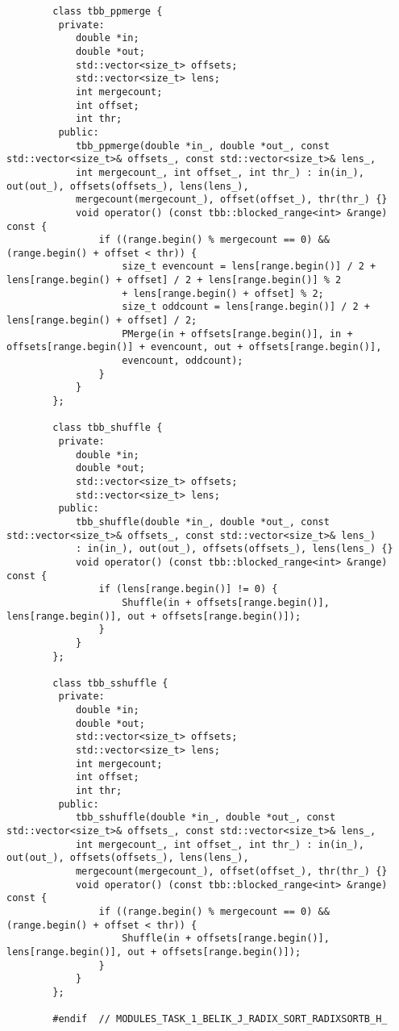 \documentclass{report}
\begin{document}
\begin{lstlisting}
		class tbb_ppmerge {
		 private:
			double *in;
			double *out;
			std::vector<size_t> offsets;
			std::vector<size_t> lens;
			int mergecount;
			int offset;
			int thr;
		 public:
			tbb_ppmerge(double *in_, double *out_, const std::vector<size_t>& offsets_, const std::vector<size_t>& lens_,
			int mergecount_, int offset_, int thr_) : in(in_), out(out_), offsets(offsets_), lens(lens_),
			mergecount(mergecount_), offset(offset_), thr(thr_) {}
			void operator() (const tbb::blocked_range<int> &range) const {
				if ((range.begin() % mergecount == 0) && (range.begin() + offset < thr)) {
					size_t evencount = lens[range.begin()] / 2 + lens[range.begin() + offset] / 2 + lens[range.begin()] % 2
					+ lens[range.begin() + offset] % 2;
					size_t oddcount = lens[range.begin()] / 2 + lens[range.begin() + offset] / 2;
					PMerge(in + offsets[range.begin()], in + offsets[range.begin()] + evencount, out + offsets[range.begin()],
					evencount, oddcount);
				}
			}
		};

		class tbb_shuffle {
		 private:
			double *in;
			double *out;
			std::vector<size_t> offsets;
			std::vector<size_t> lens;
		 public:
			tbb_shuffle(double *in_, double *out_, const std::vector<size_t>& offsets_, const std::vector<size_t>& lens_)
			: in(in_), out(out_), offsets(offsets_), lens(lens_) {}
			void operator() (const tbb::blocked_range<int> &range) const {
				if (lens[range.begin()] != 0) {
					Shuffle(in + offsets[range.begin()], lens[range.begin()], out + offsets[range.begin()]);
				}
			}
		};

		class tbb_sshuffle {
		 private:
			double *in;
			double *out;
			std::vector<size_t> offsets;
			std::vector<size_t> lens;
			int mergecount;
			int offset;
			int thr;
		 public:
			tbb_sshuffle(double *in_, double *out_, const std::vector<size_t>& offsets_, const std::vector<size_t>& lens_,
			int mergecount_, int offset_, int thr_) : in(in_), out(out_), offsets(offsets_), lens(lens_),
			mergecount(mergecount_), offset(offset_), thr(thr_) {}
			void operator() (const tbb::blocked_range<int> &range) const {
				if ((range.begin() % mergecount == 0) && (range.begin() + offset < thr)) {
					Shuffle(in + offsets[range.begin()], lens[range.begin()], out + offsets[range.begin()]);
				}
			}
		};
		
		#endif  // MODULES_TASK_1_BELIK_J_RADIX_SORT_RADIXSORTB_H_
	\end{lstlisting}
\end{document}
